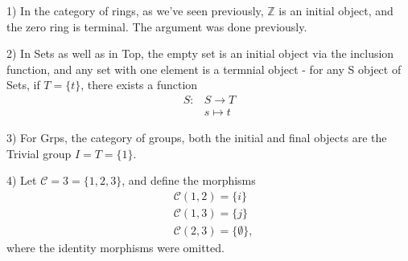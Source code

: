 \documentclass[../category_theory.tex]{subfiles}
\begin{document}
\begin{example}
	\item[1)] In the category of rings, as we've seen previously, \(\mathbb{Z}\) is an initial object, and the zero ring is terminal. The argument was done previously.
	\item[2)] In Sets as well as in Top, the empty set is an initial object via the inclusion function, and any set with one element is a termnial object - for any S object of Sets, if \(T=\{t\}\), there exists a function
	\begin{align*}
		S: & S\rightarrow T \\
		   & s\mapsto t
	\end{align*}
	\item[3)] For Grps, the category of groups, both the initial and final objects are the Trivial group \(I=T=\{1\}\).
	\item[4)] Let \(\mathcal{C}=3=\{1,2,3\}\), and define the morphisms
	\begin{align*}
		 & \mathcal{C}(1,2)=\{i\}           \\
		 & \mathcal{C}(1,3)=\{j\}           \\
		 & \mathcal{C}(2,3)=\{\emptyset \},
	\end{align*}
	where the identity morphisms were omitted.
	\begin{center}
\end{center}
\end{example}
\end{document}

